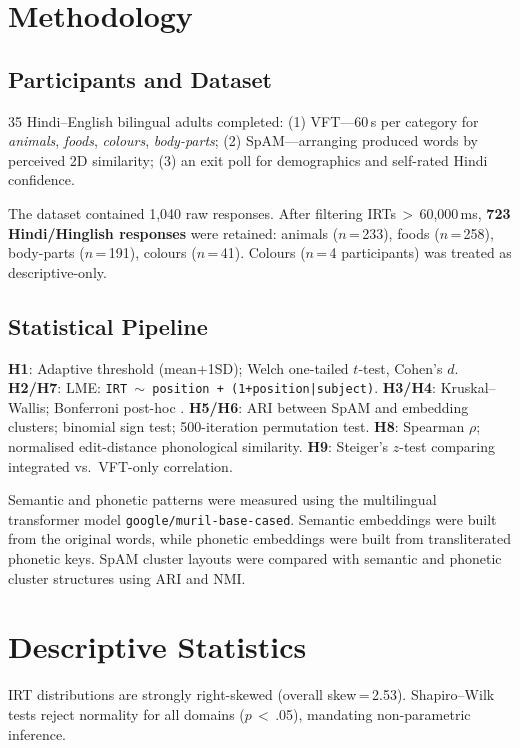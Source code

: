 \documentclass[12pt]{article}
\begin{document}
\section{Methodology}

\subsection{Participants and Dataset}

35 Hindi--English bilingual adults completed: (1) VFT---60\,s per category for \textit{animals}, \textit{foods}, \textit{colours}, \textit{body-parts}; (2) SpAM---arranging produced words by perceived 2D similarity; (3) an exit poll for demographics and self-rated Hindi confidence.

The dataset contained 1,040 raw responses. After filtering IRTs\,$>$\,60,000\,ms, \textbf{723 Hindi/Hinglish responses} were retained: animals ($n$\,=\,233), foods ($n$\,=\,258), body-parts ($n$\,=\,191), colours ($n$\,=\,41). Colours ($n$\,=\,4 participants) was treated as descriptive-only.

\subsection{Statistical Pipeline}

\textbf{H1}: Adaptive threshold (mean+1SD); Welch one-tailed $t$-test, Cohen's $d$.
\textbf{H2/H7}: LME: \texttt{IRT\,$\sim$\,position\,+\,(1+position|subject)}.
\textbf{H3/H4}: Kruskal--Wallis; Bonferroni post-hoc \citep{bh1995}.
\textbf{H5/H6}: ARI between SpAM and embedding clusters; binomial sign test; 500-iteration permutation test.
\textbf{H8}: Spearman $\rho$; normalised edit-distance phonological similarity.
\textbf{H9}: Steiger's $z$-test comparing integrated vs.\ VFT-only correlation.

Semantic and phonetic patterns were measured using the multilingual transformer model \texttt{google/muril-base-cased}. Semantic embeddings were built from the original words, while phonetic embeddings were built from transliterated phonetic keys. SpAM cluster layouts were compared with semantic and phonetic cluster structures using ARI and NMI.

\section{Descriptive Statistics}

IRT distributions are strongly right-skewed (overall skew\,=\,2.53). Shapiro--Wilk tests reject normality for all domains ($p$\,$<$\,.05), mandating non-parametric inference.
\end{document}
